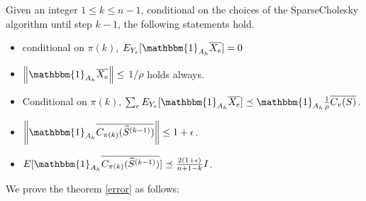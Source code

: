 \documentclass[11pt]{article}
\newcommand{\lnorm}[1]{\ensuremath{\overline{#1}}}
\begin{document}
\begin{lemma}\label{lem:4.6}
Given an integer $1 \leq k \leq n-1$, conditional on the choices of the SparseCholesky algorithm until step $k-1$,
the following statements hold.
     \begin{itemize}
     \item conditional on $\pi(k)$, $E_{Y_e}[\mathbbm{1}_{A_h} \lnorm{X_e}]=0$
     \item $\norm{\mathbbm{1}_{A_h} \lnorm{X_e}} \leq$ $1/ \rho$ holds always.
     \item Conditional on $\pi(k)$, $\sum_{e} E_{Y_e}[\mathbbm{1}_{A_h} \lnorm{X_e}] \preceq \mathbbm{1}_{A_h} \frac{1}{\rho} \lnorm{C_v(S)}$.
     \item $\norm{\mathbbm{1}_{A_h} \lnorm{C_{\pi(k)}(\widehat{S}^{(k-1)})}} \leq 1+\epsilon$.
     \item $E[{\mathbbm{1}_{A_h} \lnorm{C_{\pi(k)}(\widehat{S}^{(k-1)})}}] \preceq \frac{2(1+\epsilon)}
     {n+1-k} I$.
     \end{itemize}
\end{lemma}
We prove the theorem \ref{error} as follows:
\end{document}
